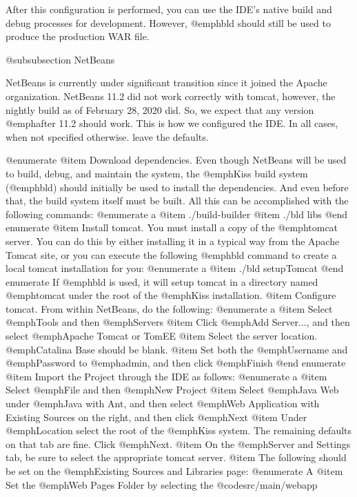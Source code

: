 After this configuration is performed, you can use the IDE's native
build and debug processes for development.  However, @emph{bld} should
still be used to produce the production WAR file.


@subsubsection NetBeans

NetBeans is currently under significant transition since it joined the Apache
organization.  NetBeans 11.2 did not work correctly with tomcat, however,
the nightly build as of February 28, 2020 did.  So, we expect that any version 
@emph{after} 11.2 should work.  This is how we configured the IDE.  In all cases,
when not specified otherwise. leave the defaults.

@enumerate
@item
Download dependencies.  Even though NetBeans will be used to build,
debug, and maintain the system, the @emph{Kiss} build system
(@emph{bld}) should initially be used to install the dependencies.
And even before that, the build system itself must be built.  All this
can be accomplished with the following commands:
@enumerate a
@item
./build-builder
@item
./bld libs
@end enumerate
@item
Install tomcat.  You must install a copy of the @emph{tomcat} server.
You can do this by either installing it in a typical way from the
Apache Tomcat site, or you can execute the following @emph{bld}
command to create a local tomcat installation for you:
@enumerate a
@item
./bld setupTomcat
@end enumerate
If @emph{bld} is used, it will setup tomcat in a directory named @emph{tomcat} under
the root of the @emph{Kiss} installation.
@item
Configure tomcat.  From within NetBeans, do the following:
@enumerate a
@item
Select @emph{Tools} and then @emph{Servers}
@item
Click @emph{Add Server...}, and then select @emph{Apache Tomcat or TomEE}
@item
Select the server location.  @emph{Catalina Base} should be blank.
@item
Set both the @emph{Username} and @emph{Password} to @emph{admin}, and then click 
@emph{Finish}
@end enumerate
@item
Import the Project through the IDE as follows:
@enumerate a
@item
Select @emph{File} and then @emph{New Project}
@item
Select @emph{Java Web} under @emph{Java with Ant}, and then select
@emph{Web Application with Existing Sources} on the right, and then
click @emph{Next}
@item
Under @emph{Location} select the root of the @emph{Kiss} system.  The
remaining defaults on that tab are fine.  Click @emph{Next}.
@item
On the @emph{Server and Settings} tab, be sure to select the
appropriate tomcat server.
@item
The following should be set on the @emph{Existing Sources and Libraries} page:
@enumerate A
@item
Set the @emph{Web Pages Folder} by selecting the @code{src/main/webapp}
